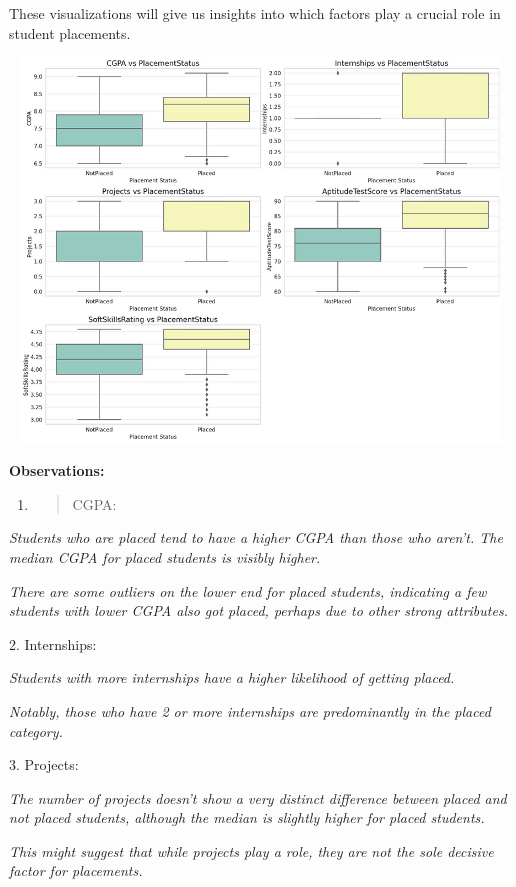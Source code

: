 \documentclass[]{article}
\begin{document}
These visualizations will give us insights into which factors play a
crucial role in student placements.

\includegraphics[width=5.26806in,height=4.01458in]{image4.png}

\textbf{Observations:}

\begin{enumerate}
\def\labelenumi{\arabic{enumi}.}
\item
  \begin{quote}
  CGPA:
  \end{quote}
\end{enumerate}

\emph{Students who are placed tend to have a higher CGPA than those who
aren't. The median CGPA for placed students is visibly higher.}

\emph{There are some outliers on the lower end for placed students,
indicating a few students with lower CGPA also got placed, perhaps due
to other strong attributes.}

2. Internships:

\emph{Students with more internships have a higher likelihood of getting
placed.}

\emph{Notably, those who have 2 or more internships are predominantly in
the placed category.}

3. Projects:

\emph{The number of projects doesn't show a very distinct difference
between placed and not placed students, although the median is slightly
higher for placed students.}

\emph{This might suggest that while projects play a role, they are not
the sole decisive factor for placements.}
\end{document}
